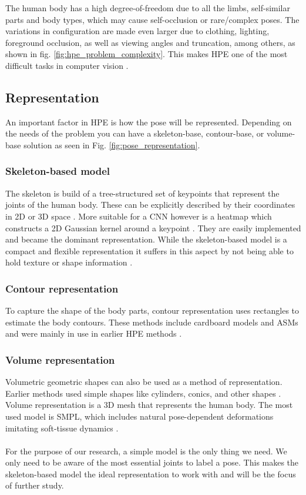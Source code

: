 The human body has a high degree-of-freedom due to all the limbs, self-similar parts and body types, which may cause self-occlusion or rare/complex poses.
The variations in configuration are made even larger due to clothing, lighting, foreground occlusion, as well as viewing angles and truncation, among others, as shown in fig. \ref{fig:hpe_problem_complexity}.
This makes \gls{HPE} one of the most difficult tasks in computer vision \cite{jain2014}\cite{Chen2000}.

\subsection{Representation}
\label{section:representation}

An important factor in \gls{HPE} is how the pose will be represented.
Depending on the needs of the problem you can have a skeleton-base, contour-base, or volume-base solution \cite{Chen2000} as seen in Fig. \ref{fig:pose_representation}.

\subsubsection{Skeleton-based model}
The skeleton is build of a tree-structured set of keypoints that represent the joints of the human body.
These can be explicitly described by their coordinates in 2D or 3D space \cite{Toshev2014}.
More suitable for a \gls{CNN} however is a heatmap which constructs a 2D Gaussian kernel around a keypoint \cite{Liu2104}\cite{SWARH}.
They are easily implemented and became the dominant representation.
While the skeleton-based model is a compact and flexible representation it suffers in this aspect by not being able to hold texture or shape information \cite{Zheng2012}.

\subsubsection{Contour representation}
To capture the shape of the body parts, contour representation uses rectangles to estimate the body contours.
These methods include cardboard models \cite{Ju96} and \gls{ASMs} \cite{COOTES95} and were mainly in use in earlier \gls{HPE} methods \cite{Chen2000}.

\subsubsection{Volume representation}
Volumetric geometric shapes can also be used as a method of representation.
Earlier methods used simple shapes like cylinders, conics, and other shapes \cite{Sidenbladh2000}.
Volume representation is a 3D mesh that represents the human body.
The most used model is \gls{SMPL}, which includes natural pose-dependent deformations imitating soft-tissue dynamics \cite{Loper2015}.  
\\
\\
For the purpose of our research, a simple model is the only thing we need.
We only need to be aware of the most essential joints to label a pose.
This makes the skeleton-based model the ideal representation to work with and will be the focus of further study.

